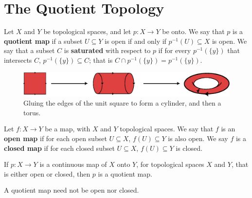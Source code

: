 
\section{The Quotient Topology}

\begin{definition}
    Let $X$ and  $Y$ be topological spaces, and let  $p:X \rightarrow Y$ be onto.
    We say that  $p$ is a \textbf {quotient map} if a subset $U \subseteq Y$ is
    open if and only if  $p^{-1}(U) \subseteq X$ is open. We say that a subset $C$ is \textbf {saturated} with respect to $p$
    if for every $p^{-1}(\{y\})$ that intersects $C$,  $p^{-1}(\{y\}) \subseteq C$; that is $C \cap
    p^{-1}(\{y\})=p^{-1}(\{y\})$.
\end{definition}

\begin{figure}[h]
    \centering
    \includegraphics[scale = 0.5]{Figures/Chapter2/square_to_torus.eps}
    \caption{Gluing the edges of the unit square to form a cylinder, and then a torus.}
    \label{fig_2.2}
\end{figure}

\begin{definition}
    Let $f:X \rightarrow Y$ be a map, with $X$ and  $Y$ topological spaces. We say that  $f$ is an
    \textbf {open map} if for each open subset $U \subseteq X$,  $f(U) \subseteq Y$ is also open. We say $f$ is a
    \textbf {closed map} if for each closed subset $U \subseteq X$,  $f(U) \subseteq Y$ is closed.
\end{definition}

\begin{lemma}\label{4.4.1}
    If $p:X \rightarrow Y$ is a continuous map of  $X$ onto  $Y$, for topological spaces  $X$ and
    $Y$, that is either open or closed, then  $p$ is a quotient map.
\end{lemma}
\begin{remark}
    A quotient map need not be open nor closed.
\end{remark}

